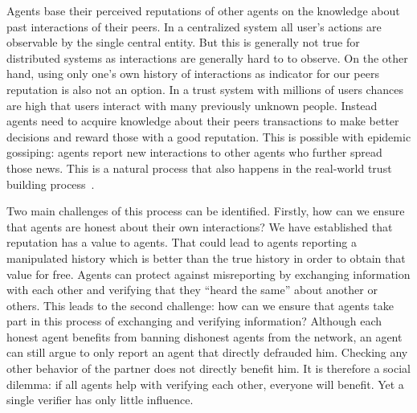 Agents base their perceived reputations of other agents on the knowledge about past interactions of 
their peers. In a centralized system all user's actions are observable by the single central entity. 
But this is generally not true for distributed systems as interactions are generally hard to to observe.
On the other hand, using only one's own history of interactions as indicator for our peers reputation
is also not an option. In a trust system with millions of users chances are high that users interact
with many previously unknown people. Instead agents need to acquire knowledge about their peers
transactions to make better decisions and reward those with a good reputation. This is possible with
epidemic gossiping: agents report new interactions to other agents who further spread those news. 
This is a natural process that also happens in the real-world trust building process~\cite{nowak2005evolution}.

Two main challenges of this process can be identified. Firstly, how can we ensure that agents are honest
about their own interactions? We have established that reputation has a value to agents. That could
lead to agents reporting a manipulated history which is better than the true history in order to 
obtain that value for free. Agents can protect against misreporting by exchanging information with 
each other and verifying that they ``heard the same'' about another or others. This leads to the 
second challenge: how can we ensure that agents take part in this process of exchanging and verifying
information? Although each honest agent benefits from banning dishonest agents from the network, an
agent can still argue to only report an agent that directly defrauded him. Checking any other 
behavior of the partner does not directly benefit him. It is therefore a social dilemma: if all 
agents help with verifying each other, everyone will benefit. Yet a single verifier has only little 
influence.


